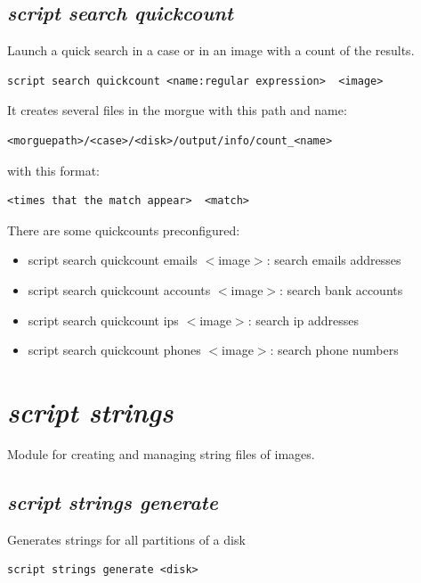 \documentclass[a4paper,11pt,oneside]{report}
\begin{document}
\subsection{\emph{script search quickcount}}

Launch a quick search in a case or in an image with a count of the results.

\begin{verbatim}
script search quickcount <name:regular expression>  <image>
\end{verbatim}

It creates several files in the morgue with this path and name:

\begin{verbatim}
<morguepath>/<case>/<disk>/output/info/count_<name>
\end{verbatim}

with this format:

\begin{verbatim}
<times that the match appear>  <match>
\end{verbatim}

There are some quickcounts preconfigured:

\begin{itemize}
\item script search quickcount emails $<$image$>$: search emails addresses
\item script search quickcount accounts $<$image$>$: search bank accounts
\item script search quickcount ips $<$image$>$: search ip addresses
\item script search quickcount phones $<$image$>$: search phone numbers
\end{itemize}




\section{\emph{script strings}}

Module for creating and managing string files of images.

\subsection{\emph{script strings generate}} 

Generates strings for all partitions of a disk 

\begin{verbatim}
script strings generate <disk>
\end{verbatim}
\end{document}

